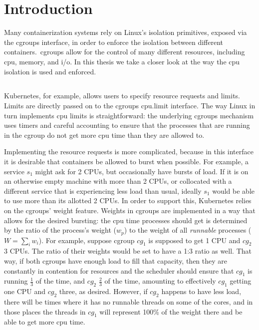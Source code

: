 
\section{Introduction}
\label{sec:introduction}

Many containerization systems rely on Linux's isolation primitives, exposed via
the cgroups interface, in order to enforce the isolation between different
containers.\ cgroups allow for the control of many different resources,
including cpu, memory, and i/o. In this thesis we take a closer look at the way
the cpu isolation is used and enforced. 

\subsection{}

Kubernetes\cite{kubernetes}, for example, allows users to specify resource
requests and limits. Limits are directly passed on to the cgroups cpu.limit
interface. The way Linux in turn implements cpu limits is straightforward: the
underlying cgroups mechanism uses timers and careful accounting to ensure that
the processes that are running in the cgroup do not get more cpu time than they
are allowed to. 

Implementing the resource requests is more complicated, because in this
interface it is desirable that containers be allowed to burst when possible. For
example, a service $s_1$ might ask for 2 CPUs, but occasionally have bursts of
load. If it is on an otherwise empty machine with more than 2 CPUs, or
collocated with a different service that is experiencing less load than usual,
ideally $s_1$ would be able to use more than its allotted 2 CPUs. In order to
support this, Kubernetes relies on the cgroups' weight feature. Weights in
cgroups are implemented in a way that allows for the desired bursting: the cpu
time processes should get is determined by the ratio of the process's weight
($w_p$) to the weight of all \textit{runnable} processes ($W = \sum_i w_i$). For
example, suppose cgroup $cg_1$ is supposed to get 1 CPU and $cg_2$ 3 CPUs. The
ratio of their weights would be set to have a 1:3 ratio as well. That way, if
both cgroups have enough load to fill that capacity, then they are constantly in
contention for resources and the scheduler should ensure that $cg_1$ is running
$\frac{1}{3}$ of the time, and $cg_2$ $\frac{2}{3}$ of the time, amounting to
effectively $cg_1$ getting one CPU and $cg_2$ three, as desired. However, if
$cg_2$ happens to have less load, there will be times where it has no runnable
threads on some of the cores, and in those places the threads in $cg_1$ will
represent 100\% of the weight there and be able to get more cpu time.


